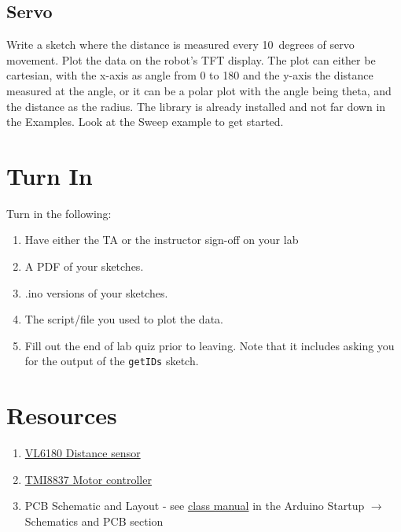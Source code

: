 \subsection{Servo}
Write a sketch where the distance is measured every 10~degrees of servo movement. Plot the
data on the robot's TFT display. The plot can either be cartesian, with the x-axis as angle
from 0 to 180 and the y-axis the distance measured at the angle, or it can be a polar plot 
with the angle being theta, and the distance as the radius. The \lstinline@Servo@ library 
is already installed and not far down in the Examples. Look at the Sweep example to get started.


\section{Turn In}
Turn in the following:
\begin{enumerate}
    \item Have either the TA or the instructor sign-off on your lab
    \item A PDF of your sketches.
    \item .ino versions of your sketches.
    \item The script/file you used to plot the data.
    \item Fill out the end of lab quiz prior to leaving. Note that it includes asking you 
            for the output of the \lstinline$getIDs$ sketch. 
\end{enumerate}

\section{Resources}\label{sec:distmotorservoresources}
\begin{enumerate}
    \item \href{https://www.st.com/resource/en/datasheet/vl6180.pdf}{VL6180 Distance sensor}
    \item \href{https://datasheet.lcsc.com/lcsc/2001060933_TMI-TMI8837_C478955.pdf}{TMI8837 Motor controller}
    \item PCB Schematic and Layout - see 
            \href{https://github.com/semcneil/Fundamentals-of-Microcontrollers-Manual}{class manual} 
            in the Arduino Startup $\rightarrow$ Schematics and PCB section
\end{enumerate}

